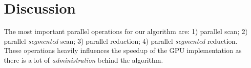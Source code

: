 \section{Discussion}

The most important parallel operations for our algorithm are: 1)
parallel scan; 2) parallel \emph{segmented} scan; 3) parallel
reduction; 4) parallel \emph{segmented} reduction. These operations
heavily influences the speedup of the GPU implementation as there is a
lot of \emph{administration} behind the algorithm.